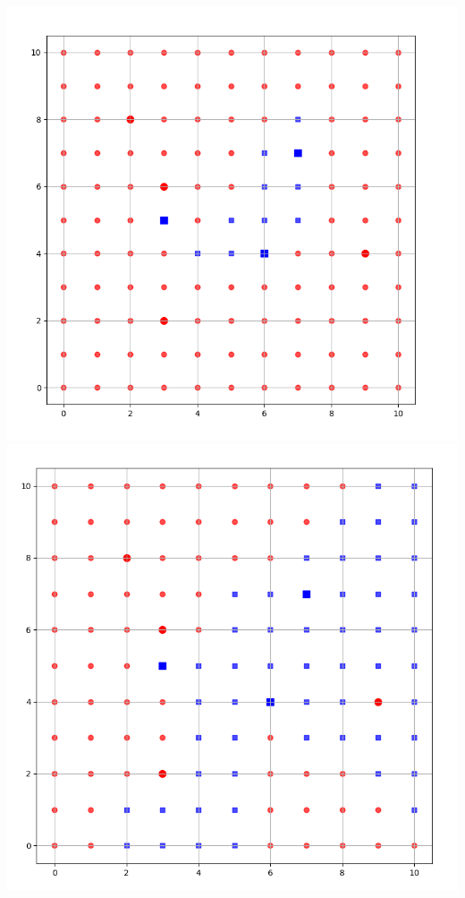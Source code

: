 \documentclass[11pt,class=report,crop=false]{standalone}
\begin{document}
\begin{activite}
\begin{enumerate}
\begin{enumerate}
\begin{center}
	\includegraphics[scale=\myscale,scale=0.13]{ecran-voisins-8c} 
	\includegraphics[scale=\myscale,scale=0.128]{ecran-voisins-8d}	
\end{center}


\end{enumerate}
\end{enumerate}
\end{activite}
\end{document}
